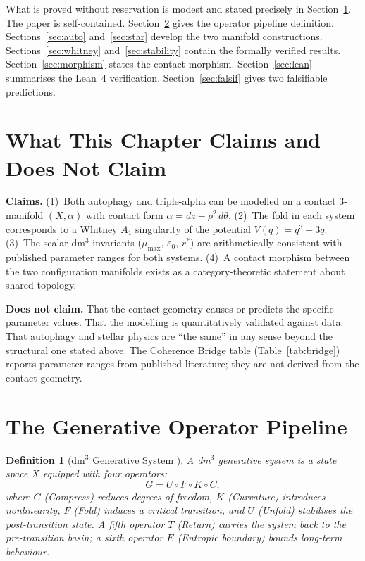 \documentclass[12pt,a4paper]{article}
\newtheorem{definition}{Definition}[section]
\begin{document}
What is proved without reservation is modest and stated precisely in
Section~\ref{sec:scope}.
The paper is self-contained.
Section~\ref{sec:pipeline} gives the operator pipeline definition.
Sections~\ref{sec:auto} and~\ref{sec:star} develop the two manifold
constructions.
Sections~\ref{sec:whitney} and~\ref{sec:stability} contain the formally
verified results.
Section~\ref{sec:morphism} states the contact morphism.
Section~\ref{sec:lean} summarises the Lean~4 verification.
Section~\ref{sec:falsif} gives two falsifiable predictions.

\section{What This Chapter Claims and Does Not Claim}
\label{sec:scope}

\textbf{Claims.}
(1)~Both autophagy and triple-alpha can be modelled on a contact
3-manifold $(X, \alpha)$ with contact form $\alpha = dz - \rho^2\,d\theta$.
(2)~The fold in each system corresponds to a Whitney $A_1$ singularity
of the potential $V(q) = q^3 - 3q$.
(3)~The scalar dm$^3$ invariants ($\mu_{\max}$, $\varepsilon_0$, $r^*$)
are arithmetically consistent with published parameter ranges for both
systems.
(4)~A contact morphism between the two configuration manifolds exists
as a category-theoretic statement about shared topology.

\textbf{Does not claim.}
That the contact geometry causes or predicts the specific parameter
values.
That the modelling is quantitatively validated against data.
That autophagy and stellar physics are ``the same'' in any sense beyond
the structural one stated above.
The Coherence Bridge table (Table~\ref{tab:bridge}) reports parameter
ranges from published literature; they are not derived from the contact
geometry.

\section{The Generative Operator Pipeline}
\label{sec:pipeline}

\begin{definition}[dm$^3$ Generative System {\cite{Grossi2026_Vol1}}]
\label{def:dm3}
A \emph{dm$^3$ generative system} is a state space $X$ equipped with
four operators:
\[
  G = U \circ F \circ K \circ C,
\]
where $C$ (\emph{Compress}) reduces degrees of freedom,
$K$ (\emph{Curvature}) introduces nonlinearity,
$F$ (\emph{Fold}) induces a critical transition,
and $U$ (\emph{Unfold}) stabilises the post-transition state.
A fifth operator $T$ (\emph{Return}) carries the system back to the
pre-transition basin; a sixth operator $E$ (\emph{Entropic boundary})
bounds long-term behaviour.
\end{definition}
\end{document}
